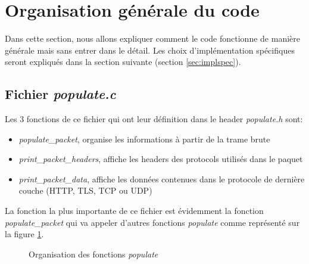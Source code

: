 \documentclass[a4paper]{article}
\begin{document}
\section{Organisation générale du code}



Dans cette section, nous allons expliquer comment le code fonctionne de manière générale mais sans entrer dans le détail. Les choix d'implémentation spécifiques seront expliqués dans la section suivante (section \ref{sec:implspec}).





\subsection{Fichier \textit{populate.c}}



Les 3 fonctions de ce fichier qui ont leur définition dans le header \textit{populate.h} sont:
\begin{itemize}
    \item \textit{populate\_packet}, organise les informations à partir de la trame brute
    \item \textit{print\_packet\_headers}, affiche les headers des protocols utilisés dans le paquet
    \item \textit{print\_packet\_data}, affiche les données contenues dans le protocole de dernière couche (HTTP, TLS, TCP ou UDP)
\end{itemize}
La fonction la plus importante de ce fichier est évidemment la fonction \textit{populate\_packet} qui va appeler d'autres fonctions \textit{populate} comme représenté sur la figure \ref{fig:orgpopulate}.
\begin{figure}[H]
    \centering
    \caption{Organisation des fonctions \textit{populate}}
    \label{fig:orgpopulate}
\end{figure}
\end{document}
